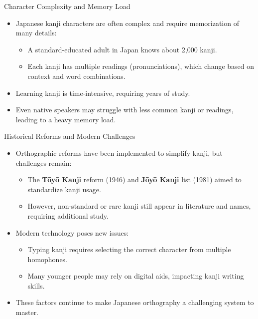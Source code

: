 \documentclass[xetex]{beamer}
\begin{document}
\begin{frame}{Character Complexity and Memory Load}
\begin{itemize}
    \item Japanese kanji characters are often complex and require memorization of many details:
    \begin{itemize}
        \item A standard-educated adult in Japan knows about 2,000 kanji.
        \item Each kanji has multiple readings (pronunciations), which change based on context and word combinations.
    \end{itemize}
    \item Learning kanji is time-intensive, requiring years of study.
    \item Even native speakers may struggle with less common kanji or readings, leading to a heavy memory load.
\end{itemize}
\end{frame}

\begin{frame}{Historical Reforms and Modern Challenges}
\begin{itemize}
    \item Orthographic reforms have been implemented to simplify kanji, but challenges remain:
    \begin{itemize}
        \item The \textbf{Tōyō Kanji} reform (1946) and \textbf{Jōyō Kanji} list (1981) aimed to standardize kanji usage.
        \item However, non-standard or rare kanji still appear in literature and names, requiring additional study.
    \end{itemize}
    \item Modern technology poses new issues:
    \begin{itemize}
        \item Typing kanji requires selecting the correct character from multiple homophones.
        \item Many younger people may rely on digital aids, impacting kanji writing skills.
    \end{itemize}
    \item These factors continue to make Japanese orthography a challenging system to master.
\end{itemize}
\end{frame}
\end{document}
